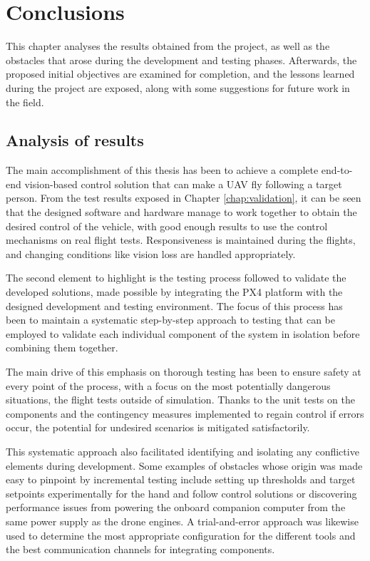 \chapter{Conclusions}
\label{chap:conclusion}

This chapter analyses the results obtained from the project, as well as the obstacles that arose during the development and testing phases.
Afterwards, the proposed initial objectives are examined for completion, and the lessons learned during the project are exposed, along with some suggestions for future work in the field.

\section{Analysis of results}
\label{sec:end-results}

The main accomplishment of this thesis has been to achieve a complete end-to-end vision-based control solution that can make a UAV fly following a target person. From the test results exposed in Chapter \ref{chap:validation}, it can be seen that the designed software and hardware manage to work together to obtain the desired control of the vehicle, with good enough results to use the control mechanisms on real flight tests. Responsiveness is maintained during the flights, and changing conditions like vision loss are handled appropriately.

The second element to highlight is the testing process followed to validate the developed solutions, made possible by integrating the PX4 platform with the designed development and testing environment. The focus of this process has been to maintain a systematic step-by-step approach to testing that can be employed to validate each individual component of the system in isolation before combining them together. 

The main drive of this emphasis on thorough testing has been to ensure safety at every point of the process, with a focus on the most potentially dangerous situations, the flight tests outside of simulation. Thanks to the unit tests on the components and the contingency measures implemented to regain control if errors occur, the potential for undesired scenarios is mitigated satisfactorily.

This systematic approach also facilitated identifying and isolating any conflictive elements during development. Some examples of obstacles whose origin was made easy to pinpoint by incremental testing include setting up thresholds and target setpoints experimentally for the hand and follow control solutions or discovering performance issues from powering the onboard companion computer from the same power supply as the drone engines. A trial-and-error approach was likewise used to determine the most appropriate configuration for the different tools and the best communication channels for integrating components.


